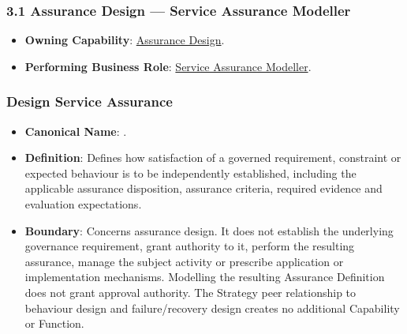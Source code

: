 \label{rad:assurance:64}
\subsubsection*{3.1 Assurance Design — Service Assurance Modeller}
\label{rad:assurance:66}

\begin{itemize}

\item
\textbf{Owning Capability}: \hyperref[rad:enabling:680]{Assurance Design}.



\item
\textbf{Performing Business Role}: \href{https://github.com/fhirfactory/harmonia/blob/98410db60155198a75f74c79d98060070209faa1/docs/markdown/03-business-architecture/actors-roles/roles.md\#service-assurance-modeller}{Service Assurance Modeller}.



\end{itemize}
\label{rad:assurance:69}



\label{rad:assurance:71}
\subsubsection*{Design Service Assurance}
\label{rad:assurance:73}

\begin{itemize}

\item
\textbf{Canonical Name}: \texttt{}.



\item
\textbf{Definition}: Defines how satisfaction of a governed requirement, constraint or expected behaviour is to be independently established, including the applicable assurance disposition, assurance criteria, required evidence and evaluation expectations.



\item
\textbf{Boundary}: Concerns assurance design. It does not establish the underlying governance requirement, grant authority to it, perform the resulting assurance, manage the subject activity or prescribe application or implementation mechanisms. Modelling the resulting Assurance Definition does not grant approval authority. The Strategy peer relationship to behaviour design and failure/\allowbreak{}recovery design creates no additional Capability or Function.



\end{itemize}
\label{rad:assurance:77}
